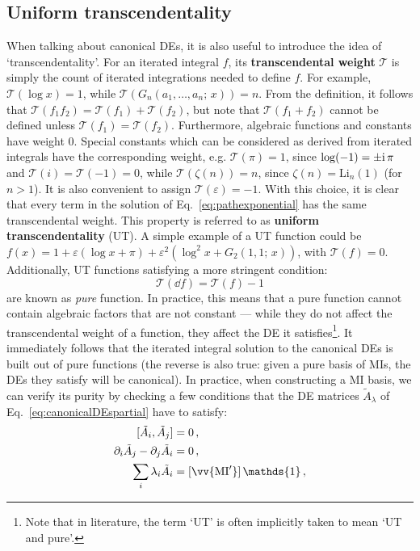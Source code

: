 \documentclass[main.tex]{subfiles}
\begin{document}
\subsection{Uniform transcendentality} \label{sec:UT}
When talking about canonical DEs, it is also useful to introduce the idea of `transcendentality'. For an iterated integral $f$, its \textbf{transcendental weight} $\mathcal{T}$ is simply the count of iterated integrations needed to define $f$\cite{Henn:2013pwa}. For example, $\mathcal{T}(\log x) = 1$, while $\mathcal{T}(G_n(a_1, \ldots, a_n;\, x)) = n$. From the definition, it follows that $\mathcal{T}(f_1 f_2) = \mathcal{T}(f_1) + \mathcal{T}(f_2)$, but note that $\mathcal{T}(f_1 + f_2)$ cannot be defined unless $\mathcal{T}(f_1) = \mathcal{T}(f_2)$. Furthermore, algebraic functions and constants have weight 0. Special constants which can be considered as derived from iterated integrals have the corresponding weight, e.g. $\mathcal{T}(\pi) = 1$, since $\log (-1) = \pm \mathrm{i}\, \pi$ and $\mathcal{T}(i) = \mathcal{T}(-1) = 0$, while $\mathcal{T}(\zeta(n)) = n$, since $\zeta(n) = \text{Li}_n(1)$ (for $n>1$). It is also convenient to assign $\mathcal{T}(\varepsilon)=-1$. With this choice, it is clear that every term in the solution of Eq.~\ref{eq:pathexponential} has the same transcendental weight. This property is referred to as \textbf{uniform transcendentality} (UT). A simple example of a UT function could be $f(x) = 1 + \varepsilon (\log x + \pi) + \varepsilon^2 (\log^2 x + G_2(1, 1;\, x))$, with $\mathcal{T}(f) = 0$. Additionally, 
UT functions satisfying a more stringent condition:
\begin{equation} \label{eq:purecondition}
    \mathcal{T}(\dd f) = \mathcal{T}(f) - 1
\end{equation}
are known as \textit{pure} function. In practice, this means that a pure function cannot contain algebraic factors that are not constant --- while they do not affect the transcendental weight of a function, they affect the DE it satisfies\footnote{Note that in literature, the term `UT' is often implicitly taken to mean `UT and pure'.}. It immediately follows that the iterated integral solution to the canonical DEs is built out of pure functions (the reverse is also true: given a pure basis of MIs, the DEs they satisfy will be canonical). In practice, when constructing a MI basis, we can verify its purity by checking a few conditions that the DE matrices $\tilde{A}_\lambda$ of Eq.~\ref{eq:canonicalDEspartial} have to satisfy:
\begin{subequations}
\begin{align}
    [ \tilde{A}_i, \tilde{A}_j] &= 0\,, \\
    \partial_i \tilde{A}_j - \partial_j \tilde{A}_i &= 0\,, \\
    \sum_i \lambda_i \tilde{A}_i &= [\vv{\text{MI}'}] \, \mathds{1} \,,
\end{align}
\end{subequations}
\end{document}
